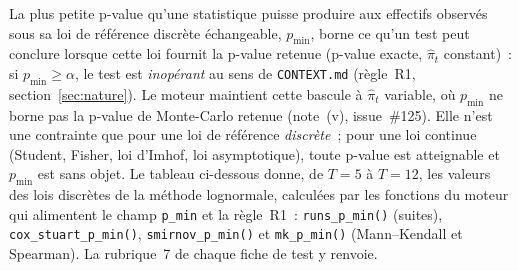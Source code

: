 \documentclass[a4paper,11pt]{article}
\newcommand{\code}[1]{\texttt{\small #1}}
\begin{document}
La plus petite p-value qu'une statistique puisse produire aux effectifs observés sous sa loi de référence discrète échangeable, $p_{\min}$, borne ce qu'un test peut conclure lorsque cette loi fournit la p-value retenue (p-value exacte, $\hat\pi_t$ constant)~: si $p_{\min} \ge \alpha$, le test est \emph{inopérant} au sens de \code{CONTEXT.md} (règle~R1, section~\ref{sec:nature}). Le moteur maintient cette bascule à $\hat\pi_t$ variable, où $p_{\min}$ ne borne pas la p-value de Monte-Carlo retenue (note~(v), issue~\#125). Elle n'est une contrainte que pour une loi
de référence \emph{discrète}~; pour une loi continue (Student, Fisher, loi d'Imhof, loi
asymptotique), toute p-value est atteignable et $p_{\min}$ est sans objet. Le tableau ci-dessous
donne, de $T = 5$ à $T = 12$, les valeurs des lois discrètes de la méthode lognormale, calculées
par les fonctions du moteur qui alimentent le champ \code{p\_min} et la règle~R1~:
\code{runs\_p\_min()} (suites), \code{cox\_stuart\_p\_min()}, \code{smirnov\_p\_min()} et
\code{mk\_p\_min()} (Mann--Kendall et Spearman). La rubrique~7 de chaque fiche de test y renvoie.
\end{document}
